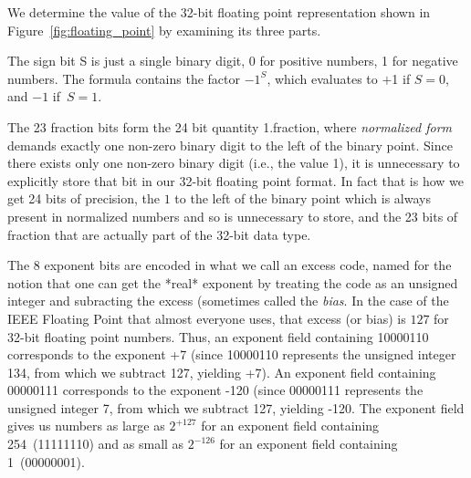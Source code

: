 \documentclass{patt}
\begin{document}
\enlargethispage{-2\baselineskip}

We determine the value of the 32-bit floating point representation shown in
Figure~\ref{fig:floating_point} by examining its three parts. 

The sign bit S is just a single binary digit, 0 for positive numbers, 1
for negative numbers. The formula contains the factor
$-1^S$, which evaluates to $+$1 if $S=0$, and $-1$ if~$S=1$.

The 23 fraction bits form the 24 bit quantity 1.fraction, where 
{\em normalized form} demands exactly one non-zero binary digit to the left of 
the binary point.  Since there exists only one non-zero binary digit (i.e., the
value 1), it is unnecessary to explicitly store that bit in our 32-bit floating 
point format.  In fact that is how we get 24 bits of precision, the $1$ to the
left of the binary point which is always present in normalized numbers and so
is unnecessary to store, and the 23 bits of fraction that are actually part of 
the 32-bit data type.

The 8 exponent bits are encoded in what we call an excess code, named for the
notion that one can get the *real* exponent by treating the code as an unsigned
integer and subracting the excess (sometimes called the {\em bias}.  In the 
case of the IEEE Floating Point that almost everyone uses, that 
excess (or bias) is $127$ for 32-bit floating point numbers.  Thus, an 
exponent field containing 10000110 corresponds to the exponent +7 (since 
10000110 represents the unsigned integer 134, from which we subtract 127, 
yielding +7).  An exponent field containing 00000111 corresponds to the 
exponent -120 (since 00000111 represents the unsigned integer 7, from which 
we subtract 127, yielding -120.  The exponent field gives us numbers as large
as $2^{+127}$ for an exponent field containing 254~(11111110) and as small as
$2^{-126}$ for an exponent field containing 1~(00000001). 

\enlargethispage{-3\baselineskip}

\pagebreak
\end{document}
